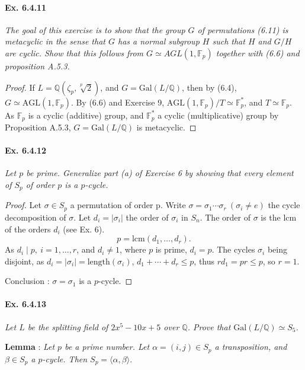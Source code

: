 \documentclass[11pt,a4paper]{article}
\newcommand{\Q}{\mathbb{Q}}
\newcommand{\F}{\mathbb{F}}
\newcommand{\Gal}{\mathrm{Gal}}
\begin{document}
\paragraph{Ex. 6.4.11}

{\it The goal of this exercise is to show that the group $G$ of permutations (6.11) is metacyclic in the sense that $G$ has a normal subgroup $H$ such that $H$ and $G/H$ are cyclic. Show that this follows from $G \simeq AGL(1,\F_p)$ together with (6.6) and proposition A.5.3.
}

\begin{proof}
If $L=\Q(\zeta_p,\sqrt[p]{2})$, and $G = \Gal(L/\Q)$, then by (6.4), $G \simeq \mathrm{AGL}(1,\F_p)$.
By (6.6) and Exercise 9, $ \mathrm{AGL}(1,\F_p)/T \simeq \F_p^*$, and $T \simeq \F_p$. As $\F_p$ is a cyclic (additive) group, and $\F_p^*$ a cyclic (multiplicative) group by Proposition A.5.3, $G = \Gal(L/\Q)$ is metacyclic.
\end{proof}

\paragraph{Ex. 6.4.12}

{\it Let $p$ be prime. Generalize part (a) of Exercise 6 by showing that every element of $S_p$ of order $p$ is a $p$-cycle.
}

\begin{proof}
Let $\sigma \in S_p$ a permutation of order p. Write $\sigma = \sigma_1\cdots\sigma_r \ (\sigma_i\neq e)$ the cycle decomposition of $\sigma$. Let $d_i = |\sigma_i|$ the order of $\sigma_i$ in $S_n$.  The order of $\sigma$ is the lcm of the orders $d_i$ (see Ex. 6).
$$p = \mathrm{lcm}(d_1,\ldots,d_r).$$
As $d_i \mid p, \ i=1,\ldots,r$, and $d_i\neq 1$, where $p$ is prime, $d_i = p$. The cycles $\sigma_i$ being disjoint, as $d_i = |\sigma_i| =  \mathrm{length}(\sigma_i)$, $d_1+\cdots+d_r\leq p$, thus $rd_1 = pr\leq p$, so $r=1$.

Conclusion :  $\sigma = \sigma_1$ is a $p$-cycle.
\end{proof}

\paragraph{Ex. 6.4.13}

{\it Let $L$ be the splitting field of $2x^5 - 10x+ 5$ over $\Q$. Prove that ${\Gal(L/\Q) \simeq S_5}$.
}

{\bf Lemma} : {\it  Let $p$ be a prime number. Let $\alpha = (i,j)\in S_p$ a transposition, and $\beta\in S_p$ a $p$-cycle. 
Then $S_p = \langle \alpha,\beta \rangle$}.
\end{document}
